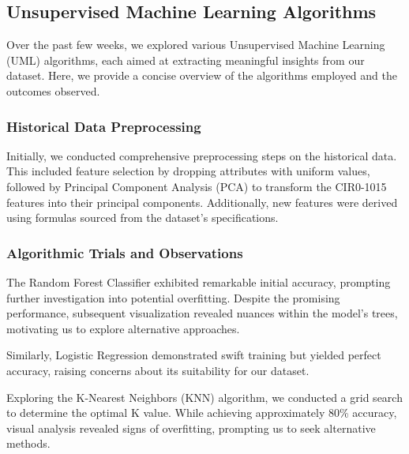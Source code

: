 

\subsection{Unsupervised Machine Learning Algorithms}\label{uml}

Over the past few weeks, we explored various Unsupervised Machine Learning (UML) algorithms, each aimed at extracting meaningful insights from our dataset. Here, we provide a concise overview of the algorithms employed and the outcomes observed.

\subsubsection{Historical Data Preprocessing}

Initially, we conducted comprehensive preprocessing steps on the historical data. This included feature selection by dropping attributes with uniform values, followed by Principal Component Analysis (PCA) to transform the CIR0-1015 features into their principal components. Additionally, new features were derived using formulas sourced from the dataset's specifications.

\subsubsection{Algorithmic Trials and Observations}

The Random Forest Classifier exhibited remarkable initial accuracy, prompting further investigation into potential overfitting. Despite the promising performance, subsequent visualization revealed nuances within the model's trees, motivating us to explore alternative approaches.

Similarly, Logistic Regression demonstrated swift training but yielded perfect accuracy, raising concerns about its suitability for our dataset.

Exploring the K-Nearest Neighbors (KNN) algorithm, we conducted a grid search to determine the optimal K value. While achieving approximately 80\% accuracy, visual analysis revealed signs of overfitting, prompting us to seek alternative methods.

